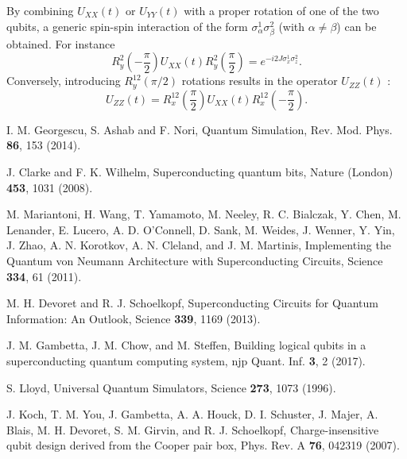 \documentclass[aps,twocolumn,groupedaddress,superscriptaddress,floatfix,amsmath,amssymb,prb]{revtex4-1}
\begin{document}
By combining $U_{XX}(t)$ or $U_{YY}(t)$ with a proper rotation of one of the two qubits, a generic spin-spin interaction of the form $\sigma_\alpha^1\sigma_\beta^2$ (with $\alpha\neq\beta$) can be obtained. For instance 
\begin{equation}
R_y^{2}\left(-\frac{\pi}{2}\right)   U_{XX}(t) R_y^{2}\left(\frac{\pi}{2}\right)  = e^{-i2J\sigma_x^1\sigma_z^2}.
\end{equation}
Conversely, introducing $R_y^{12}(\pi/2)$ rotations results in the operator $U_{ZZ}(t)$ :
\begin{equation}
U_{ZZ}(t) = R_x^{12}\left(\frac{\pi}{2}\right) U_{XX}(t) R_x^{12}\left(-\frac{\pi}{2}\right)  .
\end{equation}

\begin{thebibliography}{99}


I. M. Georgescu, S. Ashab and F. Nori,
{Quantum Simulation},
Rev. Mod. Phys. {\bf 86}, 153 (2014).

J. Clarke and F. K. Wilhelm,
{Superconducting quantum bits}, 
Nature (London) \textbf{453}, 1031 (2008).

M. Mariantoni, H. Wang,  T. Yamamoto, M. Neeley, R. C. Bialczak, Y. Chen, M. Lenander, E. Lucero, A. D. O'Connell, D. Sank, M. Weides, J. Wenner, Y. Yin, J. Zhao, A. N. Korotkov, A. N. Cleland, and J. M. Martinis,
{Implementing the Quantum von Neumann Architecture with Superconducting Circuits},
Science {\bf 334}, 61 (2011).

M. H. Devoret and R. J. Schoelkopf,
Superconducting Circuits for Quantum Information: An Outlook,
Science {\bf 339}, 1169 (2013).

J. M. Gambetta, J. M. Chow, and M. Steffen,
{Building logical qubits in a superconducting quantum computing system}, 
njp Quant. Inf. {\bf 3}, 2 (2017).

S. Lloyd,
{Universal Quantum Simulators},
Science {\bf 273}, 1073 (1996).

J. Koch, T. M. You, J. Gambetta, A. A. Houck, D. I. Schuster, J. Majer, A. Blais, M. H. Devoret, S. M. Girvin, and R. J. Schoelkopf,
{Charge-insensitive qubit design derived from the Cooper pair box}, 
Phys. Rev. A {\bf 76}, 042319 (2007).


\end{thebibliography}
\end{document}
